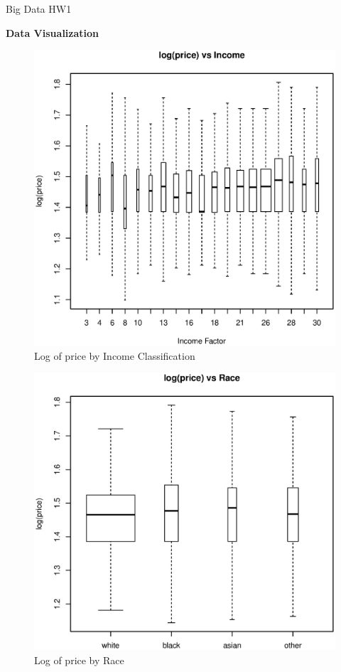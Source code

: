 \documentclass[11pt, fleqn]{article}
\begin{document}
Big Data HW1

\textbf{Data Visualization}

\begin{figure}[!htb]
\centering
\includegraphics[scale=.5]{income.eps}
\caption{Log of price by Income Classification}
\label{fig:income}
\end{figure}

\begin{figure}[!htb]
\centering
\includegraphics[scale=.5]{race.eps}
\caption{Log of price by Race}
\label{fig:race}
\end{figure}
\end{document}
